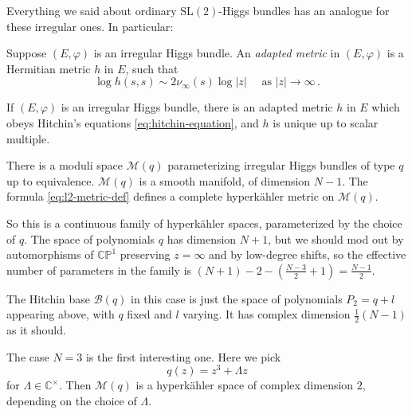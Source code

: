 \documentclass[12pt,letterpaper,reqno]{article}
\numberwithin{equation}{section}
\newcommand{\cB}{\ensuremath{\mathcal B}}
\newcommand{\cM}{\ensuremath{\mathcal M}}
\newcommand{\bbC}{\ensuremath{\mathbb C}}
\newcommand{\bbP}{\ensuremath{\mathbb P}}
\newcommand{\hk}{hyperk\"ahler\xspace}
\newcommand{\abs}[1]{\lvert#1\rvert}
\newcommand{\ti}[1]{\textit{#1}}
\newcommand{\SL}{\mathrm{SL}}
\newcommand{\fixme}[1]{{\color{orange}{[#1]}}}
\begin{document}
Everything we said about ordinary $\SL(2)$-Higgs bundles has an analogue for these 
irregular ones. 
In particular:

\begin{defn}
Suppose $(E,\varphi)$ is an irregular Higgs bundle. An \ti{adapted metric} in $(E,\varphi)$ is a Hermitian metric $h$ in $E$, such that
\begin{equation}
\log h(s,s) \sim 2 \nu_\infty(s) \log \abs{z} \quad \text{ as } \abs{z} \to \infty \, . 
\end{equation}
\end{defn}

\begin{thm}
If $(E,\varphi)$ is an irregular Higgs bundle, there is an adapted metric $h$ in $E$ which obeys Hitchin's equations \eqref{eq:hitchin-equation}, and $h$ is unique up to scalar multiple. \fixme{Mochizuki}
\end{thm}

\begin{thm}
There is a moduli space $\cM(q)$ parameterizing irregular Higgs bundles of type $q$ up to equivalence.
$\cM(q)$ is a smooth manifold, of dimension $N-1$.
The formula \eqref{eq:l2-metric-def} defines a complete \hk metric on $\cM(q)$.
\fixme{Biquard-Boalch plus epsilon}
\end{thm}

So this is a continuous family of \hk spaces, parameterized by the choice of $q$.
The space of polynomials $q$ has dimension $N+1$, but we should mod out by automorphisms
of $\bbC\bbP^1$ preserving $z = \infty$ and by low-degree shifts,
so the effective number of parameters in the family 
is $(N+1) - 2 - (\frac{N-3}{2} + 1) = \frac{N-1}{2}$.

The Hitchin base $\cB(q)$ in this case is just the space of polynomials 
$P_2 = q + l$ appearing above, with $q$ fixed and $l$ varying.
It has complex dimension $\frac12(N-1)$ as it should.

\begin{example}
The case $N=3$ is the first interesting one. Here we pick
\begin{equation}
  q(z) = z^3 + \Lambda z
\end{equation}
for $\Lambda \in \bbC^\times$. Then $\cM(q)$ is a \hk space of complex dimension $2$,
depending on the choice of $\Lambda$. \fixme{show picture of $\cB(q)$}
\end{example}


\end{document}
